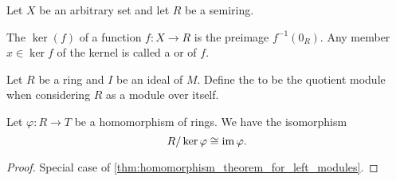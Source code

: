 \begin{definition}\label{def:semiring_kernel}
  Let \( X \) be an arbitrary set and let \( R \) be a semiring.

  The  \( \ker(f) \) of a function \( f: X \to R \) is the preimage \( f^{-1}(0_R) \). Any member \( x \in \ker f \) of the kernel is called a  or  of \( f \).
\end{definition}

\begin{definition}\label{def:quotient_semiring}
  Let \( R \) be a ring and \( I \) be an ideal of \( M \). Define the  to be the quotient module when considering \( R \) as a module over itself.
\end{definition}

\begin{theorem}\label{thm:homomorphism_theorem_for_rings}
  Let \( \varphi: R \to T \) be a homomorphism of rings. We have the isomorphism
  \begin{equation*}
    R / \ker \varphi \cong \operatorname{im} \varphi.
  \end{equation*}
\end{theorem}
\begin{proof}
  Special case of \cref{thm:homomorphism_theorem_for_left_modules}.
\end{proof}

